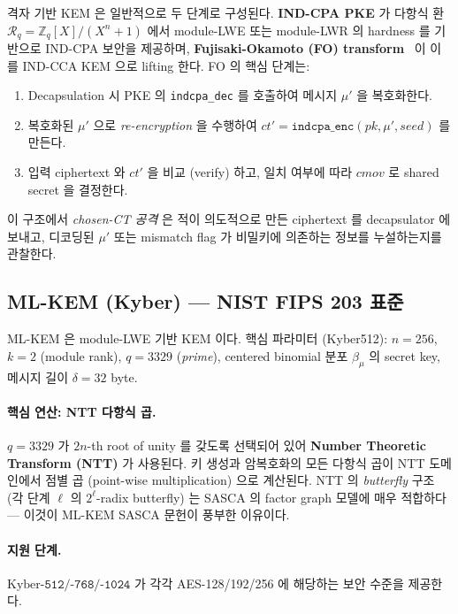\documentclass[11pt]{article}
\theoremstyle{plain}
\theoremstyle{definition}
\theoremstyle{remark}
\newcommand{\Zq}{\mathbb{Z}_q}
\newcommand{\Rq}{\mathcal{R}_q}
\begin{document}
격자 기반 KEM 은 일반적으로 두 단계로 구성된다.
\textbf{IND-CPA PKE} 가 다항식 환 $\Rq = \Zq[X]/(X^n+1)$ 에서 module-LWE
또는 module-LWR 의 hardness 를 기반으로 IND-CPA 보안을 제공하며,
\textbf{Fujisaki-Okamoto (FO) transform}~\citep{fo99,hhk17} 이 이를 IND-CCA
KEM 으로 lifting 한다. FO 의 핵심 단계는:

\begin{enumerate}[leftmargin=*]
\item Decapsulation 시 PKE 의 \texttt{indcpa\_dec} 를 호출하여 메시지
   $\mu'$ 을 복호화한다.
\item 복호화된 $\mu'$ 으로 \emph{re-encryption} 을 수행하여
   $\mathit{ct}' = \texttt{indcpa\_enc}(pk, \mu', \mathit{seed})$ 를 만든다.
\item 입력 ciphertext 와 $\mathit{ct}'$ 을 비교 (verify) 하고, 일치 여부에 따라
   $\mathit{cmov}$ 로 shared secret 을 결정한다.
\end{enumerate}

이 구조에서 \emph{chosen-CT 공격} 은 적이 의도적으로 만든 ciphertext 를
decapsulator 에 보내고, 디코딩된 $\mu'$ 또는 mismatch flag 가 비밀키에 의존하는
정보를 누설하는지를 관찰한다.

\subsection{ML-KEM (Kyber) — NIST FIPS 203 표준}

ML-KEM 은 module-LWE 기반 KEM 이다. 핵심 파라미터 (Kyber512):
$n=256$, $k=2$ (module rank), $q=3329$ (\emph{prime}), centered binomial
분포 $\beta_\mu$ 의 secret key, 메시지 길이 $\delta = 32$ byte.

\paragraph{핵심 연산: NTT 다항식 곱.}
$q = 3329$ 가 $2n$-th root of unity 를 갖도록 선택되어 있어
\textbf{Number Theoretic Transform (NTT)} 가 사용된다.
키 생성과 암복호화의 모든 다항식 곱이 NTT 도메인에서 점별 곱 (point-wise
multiplication) 으로 계산된다. NTT 의 \emph{butterfly} 구조 (각 단계
$\ell$ 의 $2^\ell$-radix butterfly) 는 SASCA 의 factor graph 모델에 매우
적합하다 — 이것이 ML-KEM SASCA 문헌이 풍부한 이유이다.

\paragraph{지원 단계.}
$\mathrm{Kyber}\texttt{-512}/\texttt{-768}/\texttt{-1024}$ 가 각각 AES-128/192/256
에 해당하는 보안 수준을 제공한다.
\end{document}
